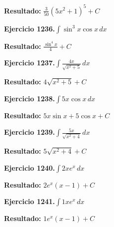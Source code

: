 \documentclass[10pt,a4paper]{article}
\begin{document}
\begin{solbox}
\textbf{Resultado:} \(\displaystyle \frac{3}{50}(5x^2+1)^{5} + C\)
\end{solbox}

\begin{ejbox}
\textbf{Ejercicio 1236.}\quad $\int \sin^{3}x \cos x\,dx$
\end{ejbox}

\begin{solbox}
\textbf{Resultado:} \(\displaystyle \frac{\sin^{4}x}{4} + C\)
\end{solbox}

\newpage
\begin{ejbox}
\textbf{Ejercicio 1237.}\quad $\int \frac{4x}{\sqrt{x^2+5}}\,dx$
\end{ejbox}

\begin{solbox}
\textbf{Resultado:} \(\displaystyle 4\sqrt{x^2+5} + C\)
\end{solbox}

\begin{ejbox}
\textbf{Ejercicio 1238.}\quad $\int 5x \cos x\,dx$
\end{ejbox}

\begin{solbox}
\textbf{Resultado:} \(\displaystyle 5x\sin x + 5\cos x + C\)
\end{solbox}

\begin{ejbox}
\textbf{Ejercicio 1239.}\quad $\int \frac{5x}{\sqrt{x^2+4}}\,dx$
\end{ejbox}

\begin{solbox}
\textbf{Resultado:} \(\displaystyle 5\sqrt{x^2+4} + C\)
\end{solbox}

\newpage
\begin{ejbox}
\textbf{Ejercicio 1240.}\quad $\int 2x e^{x}\,dx$
\end{ejbox}

\begin{solbox}
\textbf{Resultado:} \(\displaystyle 2e^x(x-1) + C\)
\end{solbox}

\begin{ejbox}
\textbf{Ejercicio 1241.}\quad $\int 1x e^{x}\,dx$
\end{ejbox}

\begin{solbox}
\textbf{Resultado:} \(\displaystyle 1e^x(x-1) + C\)
\end{solbox}
\end{document}
